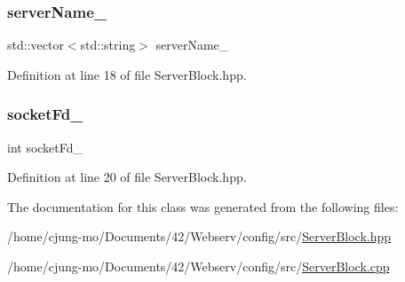 \mbox{\label{classft_1_1_server_block_adc26ae834350b4c964d4198e7a431e90}} 
\subsubsection{\texorpdfstring{server\+Name\+\_\+}{serverName\_}}
{\footnotesize\ttfamily std\+::vector$<$std\+::string$>$ server\+Name\+\_\+\hspace{0.3cm}{\ttfamily [private]}}



Definition at line 18 of file Server\+Block.\+hpp.

\mbox{\label{classft_1_1_server_block_ab9901cea4f6daccf6b8f8a3c6f438e9c}} 
\subsubsection{\texorpdfstring{socket\+Fd\+\_\+}{socketFd\_}}
{\footnotesize\ttfamily int socket\+Fd\+\_\+\hspace{0.3cm}{\ttfamily [private]}}



Definition at line 20 of file Server\+Block.\+hpp.



The documentation for this class was generated from the following files\+:\begin{DoxyCompactItemize}
\item 
/home/cjung-\/mo/\+Documents/42/\+Webserv/config/src/\hyperlink{_server_block_8hpp}{Server\+Block.\+hpp}\item 
/home/cjung-\/mo/\+Documents/42/\+Webserv/config/src/\hyperlink{_server_block_8cpp}{Server\+Block.\+cpp}\end{DoxyCompactItemize}
